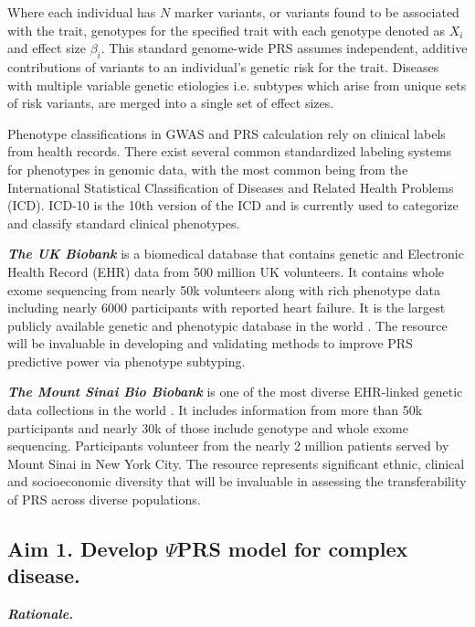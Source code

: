 \documentclass[11pt]{article}  %
\newlength\tindent
\renewcommand{\indent}{\hspace*{\tindent}}
\begin{document}
Where each individual has $N$ marker variants, or variants found to be associated with the trait, genotypes for the specified trait with each genotype denoted as $X_i$ and effect size $\beta_i$. This standard genome-wide PRS assumes independent, additive contributions of variants to an individual's genetic risk for the trait. Diseases with multiple variable genetic etiologies i.e. subtypes which arise from unique sets of risk variants, are merged into a single set of effect sizes.

Phenotype classifications in GWAS and PRS calculation rely on clinical labels from health records. There exist several common standardized labeling systems for phenotypes in genomic data, with the most common being from the International Statistical Classification of Diseases and Related Health Problems (ICD). ICD-10 is the 10th version of the ICD and is currently used to categorize and classify standard clinical phenotypes. 


\textbf{\textit{The UK Biobank}} is a biomedical database that contains genetic and Electronic Health Record (EHR) data from 500 million UK volunteers. It contains whole exome sequencing from nearly 50k volunteers along with rich phenotype data including nearly 6000 participants with reported heart failure. It is the largest publicly available genetic and phenotypic database in the world \cite{sudlow_uk_2015}. The resource will be invaluable in developing and validating methods to improve PRS predictive power via phenotype subtyping.

\textbf{\textit{The Mount Sinai Bio Biobank}} is one of the most diverse EHR-linked genetic data collections in the world \cite{belbin_toward_2021}. It includes information from more than 50k participants and nearly 30k of those include genotype and whole exome sequencing. Participants volunteer from the nearly 2 million patients served by Mount Sinai in New York City. The resource represents significant ethnic, clinical and socioeconomic diversity that will be invaluable in assessing the transferability of PRS across diverse populations.   


\subsection*{Aim 1. Develop $\Psi$PRS model for complex disease.}

\indent \textbf{\textit{Rationale.}}
\end{document}
